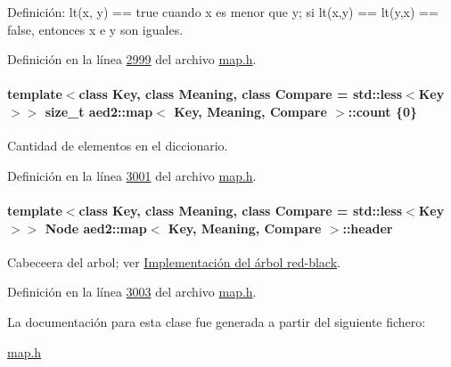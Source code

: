Definición\-: lt(x, y) == true cuando x es menor que y; si lt(x,y) == lt(y,x) == false, entonces x e y son iguales. 

Definición en la línea \hyperlink{map_8h_source_l02999}{2999} del archivo \hyperlink{map_8h_source}{map.\-h}.

\hypertarget{classaed2_1_1map_a44236c4f16cdc20a10759862b198bde4_a44236c4f16cdc20a10759862b198bde4}{
\paragraph[{count}]{\setlength{\rightskip}{0pt plus 5cm}template$<$class Key, class Meaning, class Compare = std\-::less$<$\-Key$>$$>$ size\-\_\-t {\bf aed2\-::map}$<$ Key, Meaning, Compare $>$\-::count \{0\}\hspace{0.3cm}{\ttfamily [private]}}}\label{classaed2_1_1map_a44236c4f16cdc20a10759862b198bde4_a44236c4f16cdc20a10759862b198bde4}


Cantidad de elementos en el diccionario. 



Definición en la línea \hyperlink{map_8h_source_l03001}{3001} del archivo \hyperlink{map_8h_source}{map.\-h}.

\hypertarget{classaed2_1_1map_a92d93f905c8ad73fba18fdc7e8915cce_a92d93f905c8ad73fba18fdc7e8915cce}{
\paragraph[{header}]{\setlength{\rightskip}{0pt plus 5cm}template$<$class Key, class Meaning, class Compare = std\-::less$<$\-Key$>$$>$ {\bf Node} {\bf aed2\-::map}$<$ Key, Meaning, Compare $>$\-::header\hspace{0.3cm}{\ttfamily [private]}}}\label{classaed2_1_1map_a92d93f905c8ad73fba18fdc7e8915cce_a92d93f905c8ad73fba18fdc7e8915cce}


Cabeceera del arbol; ver \hyperlink{Implementacion}{Implementación del árbol red-\/black}. 



Definición en la línea \hyperlink{map_8h_source_l03003}{3003} del archivo \hyperlink{map_8h_source}{map.\-h}.



La documentación para esta clase fue generada a partir del siguiente fichero\-:\begin{DoxyCompactItemize}
\item 
\hyperlink{map_8h}{map.\-h}\end{DoxyCompactItemize}

